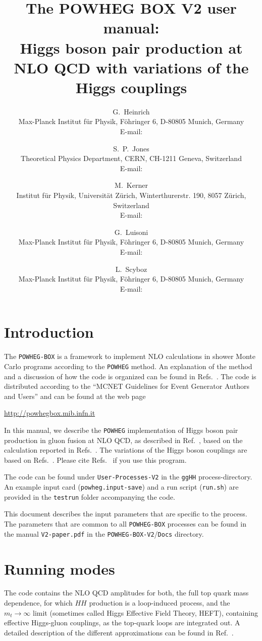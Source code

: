 \documentclass[paper]{JHEP3}
\title{The POWHEG BOX V2 user manual:\\
  Higgs boson pair production at NLO QCD with variations of the Higgs couplings} \vfill
\author{G.~Heinrich\\ 
  Max-Planck Institut f{\"u}r Physik, F\"ohringer 6, D-80805 Munich, Germany\\
  E-mail: \email{gudrun@mpp.mpg.de}
}
\author{S.~P.~Jones \\ 
Theoretical Physics Department, CERN, CH-1211 Geneva, Switzerland  \\
  E-mail: \email{s.jones@cern.ch}
}
\author{M.~Kerner \\ 
  Institut f{\"u}r Physik, Universit{\"a}t Z{\"u}rich, Winterthurerstr. 190, 8057 Z{\"u}rich, Switzerland\\
  E-mail: \email{kerner@mpp.mpg.de}
}
\author{G.~Luisoni\\
Max-Planck Institut f{\"u}r Physik, F\"ohringer 6, D-80805 Munich, Germany\\ 
  E-mail: \email{luisonig@gmail.com}
  }
\author{L.~Scyboz\\
 Max-Planck Institut f{\"u}r Physik, F\"ohringer 6, D-80805 Munich, Germany\\ 
  E-mail: \email{scyboz@mpp.mpg.de}
}
\newcommand\POWHEG{{\tt POWHEG}}
\newcommand\POWHEGBOX{{\tt POWHEG-BOX}}
\newcommand\POWHEGBOXV{{\tt POWHEG-BOX-V2}}
\begin{document}
\section{Introduction}

The \POWHEGBOX{} is a framework to implement NLO
calculations in shower Monte Carlo programs according to the \POWHEG{}
method. An explanation of the method and a discussion of how the code
is organized can be found in
Refs.~\cite{Nason:2004rx,Frixione:2007vw,Alioli:2010xd,Jezo:2015aia}.
The code is distributed according to the ``MCNET Guidelines for Event
Generator Authors and Users'' and can be found at the web page
%
\begin{center}
 \url{http://powhegbox.mib.infn.it}
\end{center}
%
In this manual, we describe the \POWHEG{} implementation of Higgs
boson pair production in gluon fusion at NLO QCD, as described in
Ref.~\cite{Heinrich:2017kxx}, based on the calculation reported in
Refs.~\cite{Borowka:2016ehy,Borowka:2016ypz}.  
The variations of the Higgs boson couplings are based on Refs.~\cite{Heinrich:2019bkc,Buchalla:2018yce}.
Please cite Refs.~\cite{Heinrich:2019bkc,Heinrich:2017kxx} if you use this program.

The code can be found under {\tt User-Processes-V2} in the {\tt ggHH} process-directory. 
An example input card ({\tt powheg.input-save}) and a run script ({\tt run.sh}) 
are provided in the {\tt testrun} folder accompanying the code.

This document describes the input parameters that are specific to the process. The
parameters that are common to all \POWHEGBOX{} processes can be found
in the manual {\tt V2-paper.pdf} in the \POWHEGBOXV{}/{\tt Docs} directory.

\section{Running modes}
The code contains the NLO QCD amplitudes for both, the full top quark mass dependence, 
for which $HH$ production is a loop-induced process, and the
$m_t\to \infty$ limit (sometimes called Higgs Effective Field Theory, HEFT), 
containing effective Higgs-gluon couplings, as the top-quark loops are integrated out.  
A detailed description of the different approximations can be found in Ref.~\cite{Borowka:2016ypz}.
\end{document}
